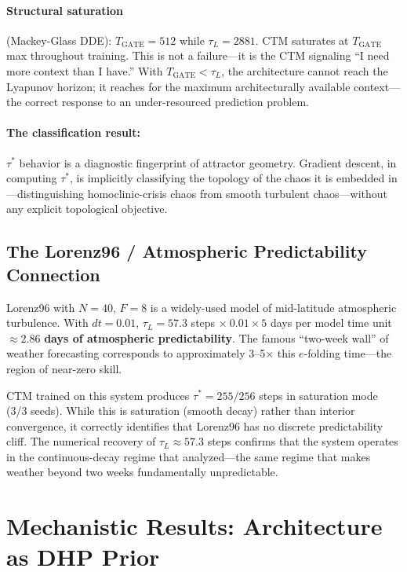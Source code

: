 \documentclass[12pt]{article}
\begin{document}
\paragraph{Structural saturation} (Mackey-Glass DDE): $T_{\text{GATE}}=512$ while
$\tau_L=2881$. CTM saturates at $T_{\text{GATE}}$ max throughout training. This is not a
failure---it is the CTM signaling ``I need more context than I have.'' With
$T_{\text{GATE}} < \tau_L$, the architecture cannot reach the Lyapunov horizon; it reaches
for the maximum architecturally available context---the correct response to an
under-resourced prediction problem.

\paragraph{The classification result:} $\tau^*$ behavior is a diagnostic fingerprint of
attractor geometry. Gradient descent, in computing $\tau^*$, is implicitly classifying the
topology of the chaos it is embedded in---distinguishing homoclinic-crisis chaos from
smooth turbulent chaos---without any explicit topological objective.

\subsection{The Lorenz96 / Atmospheric Predictability Connection}

Lorenz96 with $N=40$, $F=8$ is a widely-used model of mid-latitude atmospheric turbulence.
With $dt=0.01$, $\tau_L = 57.3$ steps $\times\ 0.01 \times 5$ days per model time unit
$\approx \mathbf{2.86}$ \textbf{days of atmospheric predictability}. The famous
``two-week wall'' of weather forecasting \citep{lorenz1969atmospheric} corresponds to
approximately 3--5$\times$ this $e$-folding time---the region of near-zero skill.

CTM trained on this system produces $\tau^* = 255/256$ steps in saturation mode (3/3
seeds). While this is saturation (smooth decay) rather than interior convergence, it
correctly identifies that Lorenz96 has no discrete predictability cliff. The numerical
recovery of $\tau_L \approx 57.3$ steps confirms that the system operates in the
continuous-decay regime that \citet{lorenz1969atmospheric} analyzed---the same regime that
makes weather beyond two weeks fundamentally unpredictable.

\section{Mechanistic Results: Architecture as DHP Prior}
\label{sec:mechanistic}
\end{document}
